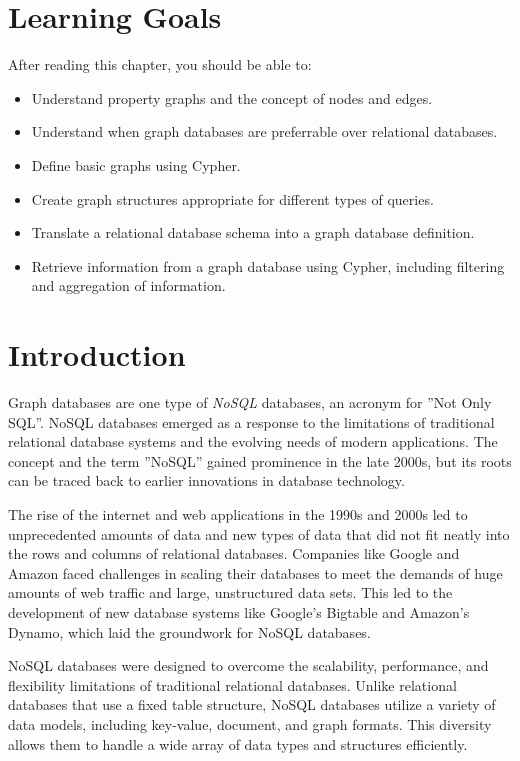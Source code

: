 %
%
\section*{Learning Goals}

After reading this chapter, you should be able to:
\begin{itemize}
   \item Understand property graphs and the concept of nodes and edges.
   \item Understand when graph databases are preferrable over relational databases.
   \item Define basic graphs using Cypher.
   \item Create graph structures appropriate for different types of queries. 
   \item Translate a relational database schema into a graph database definition.
   \item Retrieve information from a graph database using Cypher, including filtering and aggregation of information.
\end{itemize}

\section{Introduction}

Graph databases are one type of \emph{NoSQL} databases, an acronym for ''Not Only SQL''. NoSQL databases emerged as a response to the limitations of traditional relational database systems and the evolving needs of modern applications. The concept and the term ''NoSQL'' gained prominence in the late 2000s, but its roots can be traced back to earlier innovations in database technology.

The rise of the internet and web applications in the 1990s and 2000s led to unprecedented amounts of data and new types of data that did not fit neatly into the rows and columns of relational databases. Companies like Google and Amazon faced challenges in scaling their databases to meet the demands of huge amounts of web traffic and large, unstructured data sets. This led to the development of new database systems like Google's Bigtable and Amazon's Dynamo, which laid the groundwork for NoSQL databases.

NoSQL databases were designed to overcome the scalability, performance, and flexibility limitations of traditional relational databases. Unlike relational databases that use a fixed table structure, NoSQL databases utilize a variety of data models, including key-value, document, and graph formats. This diversity allows them to handle a wide array of data types and structures efficiently.

